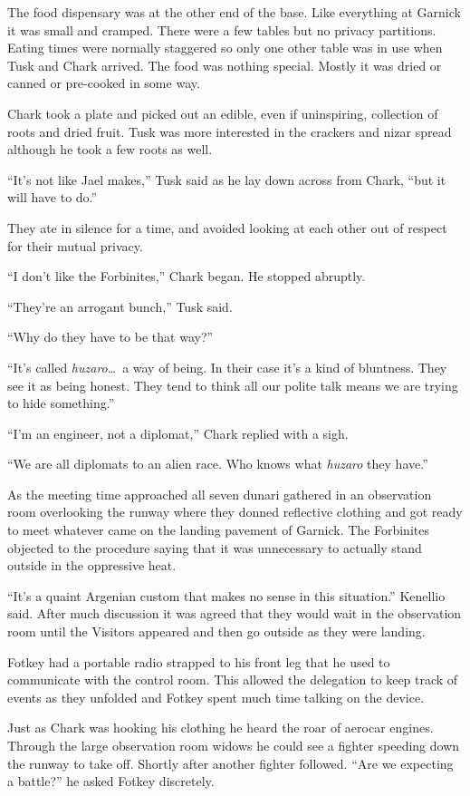 The food dispensary was at the other end of the base. Like everything at Garnick it was small
and cramped. There were a few tables but no privacy partitions. Eating times were normally
staggered so only one other table was in use when Tusk and Chark arrived. The food was nothing
special. Mostly it was dried or canned or pre-cooked in some way.

Chark took a plate and picked out an edible, even if uninspiring, collection of roots and dried
fruit. Tusk was more interested in the crackers and nizar spread although he took a few roots as
well.

``It's not like Jael makes,'' Tusk said as he lay down across from Chark, ``but it will have to
do.''

They ate in silence for a time, and avoided looking at each other out of respect for their
mutual privacy.

``I don't like the Forbinites,'' Chark began. He stopped abruptly.

``They're an arrogant bunch,'' Tusk said.

``Why do they have to be that way?''

``It's called \textit{huzaro}\ldots\ a way of being. In their case it's a kind of bluntness.
They see it as being honest. They tend to think all our polite talk means we are trying to hide
something.''

``I'm an engineer, not a diplomat,'' Chark replied with a sigh.

``We are all diplomats to an alien race. Who knows what \textit{huzaro} they have.''

As the meeting time approached all seven dunari gathered in an observation room overlooking the
runway where they donned reflective clothing and got ready to meet whatever came on the landing
pavement of Garnick. The Forbinites objected to the procedure saying that it was unnecessary to
actually stand outside in the oppressive heat.

``It's a quaint Argenian custom that makes no sense in this situation.'' Kenellio said. After
much discussion it was agreed that they would wait in the observation room until the Visitors
appeared and then go outside as they were landing.

Fotkey had a portable radio strapped to his front leg that he used to communicate with the
control room. This allowed the delegation to keep track of events as they unfolded and Fotkey
spent much time talking on the device.

Just as Chark was hooking his clothing he heard the roar of aerocar engines. Through the large
observation room widows he could see a fighter speeding down the runway to take off. Shortly
after another fighter followed. ``Are we expecting a battle?'' he asked Fotkey discretely.

